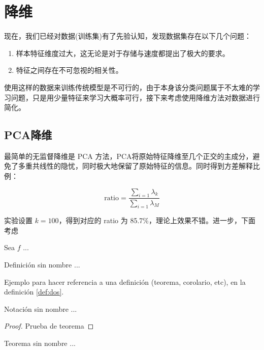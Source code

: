 \documentclass[fleqn]{Paquetes/RevDigMatEduInt}
\begin{document}
\section{降维}
现在，我们已经对数据(训练集)有了先验认知，发现数据集存在以下几个问题：
\begin{observacion}
\begin{enumerate}
	\item 样本特征维度过大，这无论是对于存储与速度都提出了极大的要求。
	\item 特征之间存在不可忽视的相关性。
\end{enumerate}
\end{observacion}
使用这样的数据来训练传统模型是不可行的，由于本身该分类问题属于不太难的学习问题，只是用少量特征来学习大概率可行，接下来考虑使用降维方法对数据进行简化。
\subsection{PCA降维}
最简单的无监督降维是 PCA 方法，PCA将原始特征降维至几个正交的主成分，避免了多重共线性的隐忧，同时极大地保留了原始特征的信息。同时得到方差解释比例：

\begin{lema}
$$\mathrm{ratio}=\frac{\sum_{i=1}\lambda_{k}}{\sum_{i=1}\lambda_M}$$
\end{lema}
 
实验设置 $k=100$，得到对应的 ratio 为 85.7\%，理论上效果不错。进一步，下面考虑


\begin{definicion}
	Sea $f$ ...
\end{definicion}

\begin{definicion}
Definición sin nombre ...
\end{definicion}

Ejemplo para hacer referencia a una definición (teorema, corolario, etc), en la definición \ref{def:dos}.

\begin{notacion}
	Notación sin nombre ...
\end{notacion}



\begin{proof}
	Prueba de teorema
\end{proof}

\begin{teorema}
Teorema sin nombre ...
\end{teorema}
\end{document}
